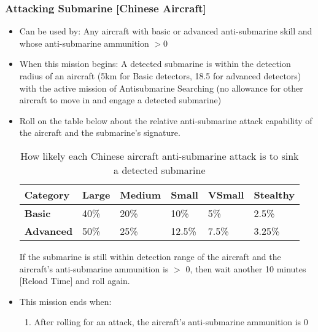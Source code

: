 \documentclass{article}
\begin{document}
        \subsubsection{Attacking Submarine [Chinese Aircraft]}
            \begin{itemize}
                \item Can be used by: Any aircraft with basic or advanced anti-submarine skill and whose anti-submarine ammunition $>0$
                \item When this mission begins: A detected submarine is within the detection radius of an aircraft (5km for Basic detectors, 18.5 for advanced detectors) with the active mission of Antisubmarine Searching (no allowance for other aircraft to move in and engage a detected submarine)
                \item Roll on the table below about the relative anti-submarine attack capability of the aircraft and the submarine's signature.
                    \begin{table}[h!]
                        \centering
                        \begin{tabularx}{\textwidth}{|l|X|X|X|X|X|}
                        \hline
                        \textbf{Category} & \textbf{Large} & \textbf{Medium} & \textbf{Small} & \textbf{VSmall} & \textbf{Stealthy} \\
                        \hline
                        \textbf{Basic} & 40\% & 20\% & 10\% & 5\% & 2.5\% \\
                        \hline
                        \textbf{Advanced} & 50\% & 25\% & 12.5\% & 7.5\% & 3.25\% \\
                        \hline
                        \end{tabularx}
                        \caption{How likely each Chinese aircraft anti-submarine attack is to sink a detected submarine}
                        \label{table:ChineseAircraftAttackingSubmarines}
                    \end{table}
            If the submarine is still within detection range of the aircraft and the aircraft's anti-submarine ammunition is $>$ 0, then wait another 10 minutes [Reload Time] and roll again.
                \item This mission ends when:
                \begin{enumerate}[label=\arabic*)]
                    \item After rolling for an attack, the aircraft's anti-submarine ammunition is 0\par

\end{enumerate}
\end{itemize}
\end{document}
